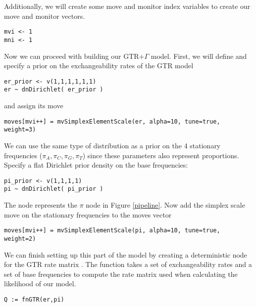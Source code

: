 Additionally, we will create some move and monitor index variables to create our move and monitor vectors.

{\tt \begin{snugshade*}
\begin{lstlisting}
mvi <- 1
mni <- 1
\end{lstlisting}
\end{snugshade*}}

Now we can proceed with building our GTR$+\Gamma$ model.
First, we will define and specify a prior on the exchangeability rates of the GTR model

{\tt \begin{snugshade*}
\begin{lstlisting}
er_prior <- v(1,1,1,1,1,1) 
er ~ dnDirichlet( er_prior )
\end{lstlisting}
\end{snugshade*}}

and assign its move

{\tt \begin{snugshade*}
\begin{lstlisting}
moves[mvi++] = mvSimplexElementScale(er, alpha=10, tune=true, weight=3) 
\end{lstlisting}
\end{snugshade*}}

We can use the same type of distribution as a prior on the 4 stationary frequencies ($\pi_A, \pi_C, \pi_G, \pi_T$) since these parameters also represent proportions. 
Specify a flat Dirichlet prior density on the base frequencies:
{\tt \begin{snugshade*}
\begin{lstlisting}
pi_prior <- v(1,1,1,1) 
pi ~ dnDirichlet( pi_prior )
\end{lstlisting}
\end{snugshade*}}

The node  represents the $\pi$ node in Figure \ref{pipeline}.
Now add the simplex scale move on the stationary frequencies to the moves vector

{\tt \small \begin{snugshade*}
\begin{lstlisting}
moves[mvi++] = mvSimplexElementScale(pi, alpha=10, tune=true, weight=2) 
\end{lstlisting}
\end{snugshade*}}

We can finish setting up this part of the model by creating a deterministic node for the GTR rate matrix . 
The  function takes a set of exchangeability rates and a set of base frequencies to compute the rate matrix used when calculating the likelihood of our model.
{\tt \begin{snugshade*}
\begin{lstlisting}
Q := fnGTR(er,pi)
\end{lstlisting}
\end{snugshade*}}


